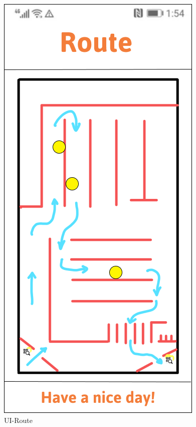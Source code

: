 \documentclass[a4paper,12pt]{report}
\begin{document}
\begin{figure}[H]
	\begin{minipage}[t]{0.56\linewidth}
		\centering
		\includegraphics[scale=0.5]{UI-Route}
		\caption{UI-Route}
		\label{fig:UI-Route}
	\end{minipage}%
	\begin{minipage}[t]{0.56\linewidth}
		\centering

\end{minipage}
\end{figure}
\end{document}
